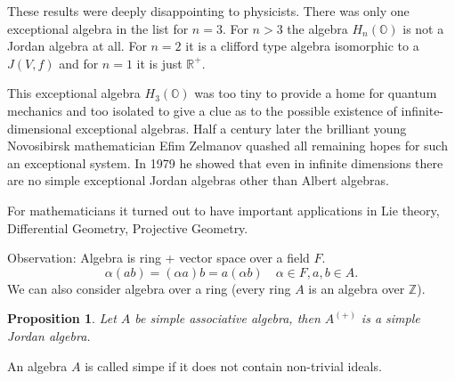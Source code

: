\documentclass{article}
\newtheorem{proposition}[theorem]{Proposition}
\begin{document}
These results were deeply disappointing to physicists. There was only one exceptional algebra in the list for $n=3$. For $n>3$ the algebra $H_n(\mathbb{O})$ is not a Jordan algebra at all. For $n=2$ it is a clifford type algebra isomorphic to a $J(V,f)$ and for $n=1$ it is just $\mathbb{R}^+$.

This exceptional algebra $H_3(\mathbb{O})$ was too tiny to provide a home for quantum mechanics and too isolated to give a clue as to the possible existence of infinite-dimensional exceptional algebras. Half a century later the brilliant young Novosibirsk mathematician Efim Zelmanov quashed all remaining hopes for such an exceptional system. In 1979 he showed that even in infinite dimensions there are no simple exceptional Jordan algebras other than Albert algebras.

For mathematicians it turned out to have important applications in Lie theory, Differential Geometry, Projective Geometry.

Observation: Algebra is ring + vector space over a field $ F $.
\[ \alpha(ab) = (\alpha a)b = a(\alpha b) \quad \alpha \in F, a,b \in A. \]
We can also consider algebra over a ring (every ring $A$ is an algebra over $\mathbb{Z}$).

\begin{proposition}
Let $ A $ be simple associative algebra, then $ A^{(+)} $ is a simple Jordan algebra.
\end{proposition}

\begin{definition} 
An algebra $ A $ is called simpe if it does not contain non-trivial ideals. 
\end{definition}
\end{document}
